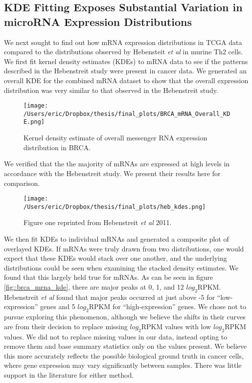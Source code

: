 \documentclass[12pt]{report}
\begin{document}


\subsection*{KDE Fitting Exposes Substantial Variation in microRNA Expression Distributions}
We next sought to find out how mRNA expression distributions in TCGA data compared to the distributions observed by Hebensteit \textit{et al} in murine Th2 cells. We first fit kernel density estimates (KDEs) to 
mRNA data to see if the patterns described in the Hebenstreit study were present in cancer data. We generated an overall KDE for the combined mRNA dataset to show
that the overall expression distribution was very similar to that observed in the Hebenstreit study.

\begin{figure}[H]
\centering
 \texttt{[image: /Users/eric/Dropbox/thesis/final\_plots/BRCA\_mRNA\_Overall\_KDE.png]}
 \caption{Kernel density estimate of overall messenger RNA expression distribution in BRCA.}
 \label{fig::brca_mrna_overall_kde}
\end{figure}

We verified that the the majority of mRNAs are expressed at high levels in accordance with the Hebenstreit study.  We present their results here for comparison.

\begin{figure}[H]
\centering
 \texttt{[image: /Users/eric/Dropbox/thesis/final\_plots/heb\_kdes.png]}
 \caption{Figure one reprinted from Hebenstreit \textit{et al } 2011.}
 \label{fig::brca_mrna_and_heb}
\end{figure}

We then fit KDEs to individual mRNAs and generated a composite plot of overlayed KDEs. If mRNAs were truly drawn from two distributions, one would expect that these
KDEs would stack over one another, and the underlying distributions could be seen when examining the stacked density estimates. We found that this largely held true for mRNAs.
As can be seen in figure \ref{fig::brca_mrna_kde}, there are major peaks at 0, 1, and 12 $log_{2} \text{RPKM}$. Hebenstreit \textit{et al} found that major peaks occurred at just above -5 
for ``low-expression'' genes and 5 $log_{2} \text{RPKM}$ for ``high-expression'' genes. We chose not to pursue exploring this phenomenon, although we believe the shifts in their curves
are from their decision to replace missing $log_{2} \text{RPKM}$ values with low $log_{2} \text{RPKM}$ values. We did not to replace missing values in our data, instead opting to remove them
and base summary statistics only on the values present. We believe this more accurately reflects the possible biological ground truth in cancer cells, where gene expression may vary
significantly between samples. There was little support in the literature for either method. %
\end{document}
